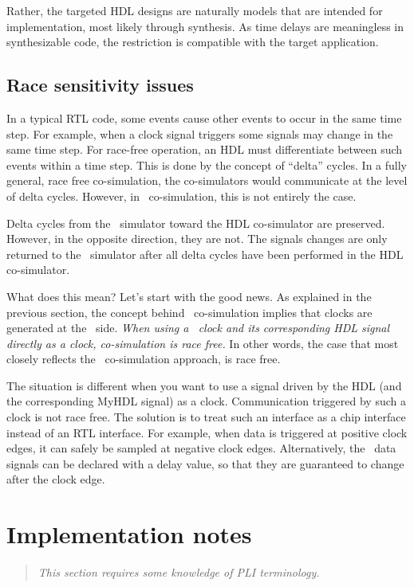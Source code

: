 Rather, the targeted HDL designs are naturally models that are
intended for implementation, most likely through synthesis. As time
delays are meaningless in synthesizable code, the restriction is
compatible with the target application.

\subsection{Race sensitivity issues}

In a typical RTL code, some events cause other events to occur in the
same time step. For example, when a clock signal triggers some signals
may change in the same time step. For race-free operation, an HDL
must differentiate between such events within a time step. This is done
by the concept of ``delta'' cycles. In a fully general, race free
co-simulation, the co-simulators would communicate at the level of delta
cycles. However, in \myhdl\ co-simulation, this is not entirely the
case.

Delta cycles from the \myhdl\ simulator toward the HDL co-simulator are
preserved. However, in the opposite direction, they are not. The
signals changes are only returned to the \myhdl\ simulator after all delta
cycles have been performed in the HDL co-simulator.

What does this mean? Let's start with the good news. As explained in
the previous section, the concept behind \myhdl\ co-simulation implies
that clocks are generated at the \myhdl\ side.  \emph{When using a
\myhdl\ clock and its corresponding HDL signal directly as a clock,
co-simulation is race free.} In other words, the case
that most closely reflects the \myhdl\ co-simulation approach, is race free.

The situation is different when you want to use a signal driven by the
HDL (and the corresponding MyHDL signal) as a clock. 
Communication triggered by such a clock is not race free. The solution
is to treat such an interface as a chip interface instead of an RTL
interface.  For example, when data is triggered at positive clock
edges, it can safely be sampled at negative clock edges.
Alternatively, the \myhdl\ data signals can be declared with a delay
value, so that they are guaranteed to change after the clock
edge.


\section{Implementation notes}

\begin{quote}
\em
This section requires some knowledge of PLI terminology.
\end{quote}

